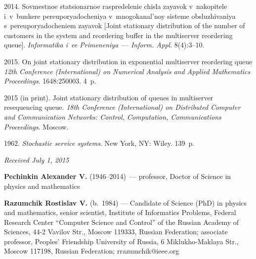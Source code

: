 \begin{multicols}{2}
{{\begin{thebibliography}{99}
 2014.
Sovmestnoe statsionarnoe raspredelenie chisla zayavok v~nakopitele i~v~bunkere 
pereuporyadocheniya v~mnogokanal'noy sisteme obsluzhivaniya s~pereuporyadocheniem 
zayavok [Joint stationary distribution of the number of customers in the system and 
reordering buffer in the multiserver reordering queue].
\textit{Informatika i~ee Primeneniya}~--- \textit{Inform. Appl}. 8(4):3--10.

 2015.
On joint stationary distribution in exponential
multiserver reordering queue
\textit{12th  Conference (International) on
Numerical Analysis and Applied Mathematics Proceedings}. 1648:250003. 4~p.


 2015 (in print).
Joint stationary distribution of queues in multiserver resequencing
queue. \textit{18th  Conference (International) on Distributed Computer and 
Communication Networks: Control, Computation, Communications Proceedings}. Moscow. 

 1962.
\textit{Stochastic service systems}. New York, NY: Wiley. 139~p.
\end{thebibliography}

 }
 }

\end{multicols}

\vspace*{-3pt}

\hfill{\small\textit{Received July 1, 2015}}


\Contr

\noindent
\textbf{Pechinkin Alexander V.} (1946--2014)~--- professor, Doctor
of Science in physics and mathematics

\vspace*{3pt}

\noindent
\textbf{Razumchik Rostislav V.} (b.\ 1984) --- Candidate
of Science (PhD) in physics and mathematics,
senior scientist, Institute of Informatics Problems, 
Federal Research Center ``Computer Science and Control'' of the Russian Academy of 
Sciences,
44-2 Vavilov Str.,
Moscow 119333, Russian Federation; associate professor,
Peoples' Friendship University of Russia,
6 Miklukho-Maklaya Str., Moscow 117198, Russian Federation; rrazumchik@ieee.org


\label{end\stat}


\renewcommand{\bibname}{\protect\rm Литература}